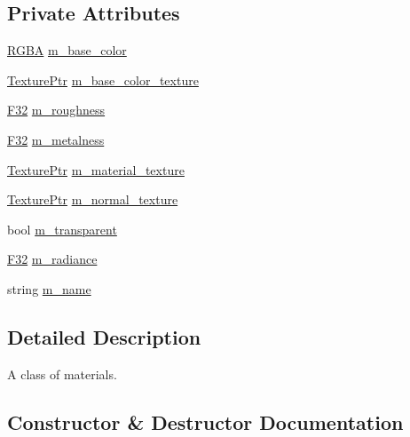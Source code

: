 \subsection*{Private Attributes}
\begin{DoxyCompactItemize}
\item 
\hyperlink{structmage_1_1_r_g_b_a}{R\+G\+BA} \hyperlink{classmage_1_1rendering_1_1_material_aab907c723f66f06c8512014e7e217778}{m\+\_\+base\+\_\+color}
\item 
\hyperlink{namespacemage_1_1rendering_a6f3ae54f825328465b0cdde0f0de4a36}{Texture\+Ptr} \hyperlink{classmage_1_1rendering_1_1_material_aaee7a296b1f966a1544a07d21e13b8f6}{m\+\_\+base\+\_\+color\+\_\+texture}
\item 
\hyperlink{namespacemage_aa97e833b45f06d60a0a9c4fc22ae02c0}{F32} \hyperlink{classmage_1_1rendering_1_1_material_a14b420a0bdb8cb1f0fa57aa31bd09ae1}{m\+\_\+roughness}
\item 
\hyperlink{namespacemage_aa97e833b45f06d60a0a9c4fc22ae02c0}{F32} \hyperlink{classmage_1_1rendering_1_1_material_a1ec138a6dfec09ac421517480bd08a75}{m\+\_\+metalness}
\item 
\hyperlink{namespacemage_1_1rendering_a6f3ae54f825328465b0cdde0f0de4a36}{Texture\+Ptr} \hyperlink{classmage_1_1rendering_1_1_material_a4292698d8326e4f28dc45d59e00296dd}{m\+\_\+material\+\_\+texture}
\item 
\hyperlink{namespacemage_1_1rendering_a6f3ae54f825328465b0cdde0f0de4a36}{Texture\+Ptr} \hyperlink{classmage_1_1rendering_1_1_material_a14911430f38bc998c6d0735dc129f234}{m\+\_\+normal\+\_\+texture}
\item 
bool \hyperlink{classmage_1_1rendering_1_1_material_af9f8d0fdb613bce1a4c3683836649bf3}{m\+\_\+transparent}
\item 
\hyperlink{namespacemage_aa97e833b45f06d60a0a9c4fc22ae02c0}{F32} \hyperlink{classmage_1_1rendering_1_1_material_ac79fc4d9a669a552d7319ae713f25871}{m\+\_\+radiance}
\item 
string \hyperlink{classmage_1_1rendering_1_1_material_a16f309220930c59f17b25fd8b0b62446}{m\+\_\+name}
\end{DoxyCompactItemize}


\subsection{Detailed Description}
A class of materials. 

\subsection{Constructor \& Destructor Documentation}
\hypertarget{classmage_1_1rendering_1_1_material_a0d23055b62f54a28c77010412099a446}{}\label{classmage_1_1rendering_1_1_material_a0d23055b62f54a28c77010412099a446} 
